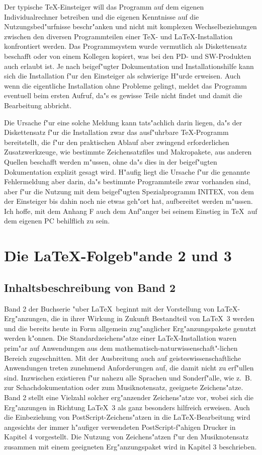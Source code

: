 \documentclass[twoside]{report}
\begin{document}
Der typische \TeX-Einsteiger will das Programm auf dem eigenen 
Individualrechner betreiben und die eigenen Kenntnisse auf die 
Nutzungsbed"urfnisse beschr"anken und nicht mit komplexen Wechselbeziehungen
zwischen den diversen Programmteilen einer \TeX- und \LaTeX-Installation
konfrontiert werden. Das Programmsystem wurde vermutlich als Diskettensatz
beschafft oder von einem Kollegen kopiert, was bei den PD- und SW-Produkten
auch erlaubt ist. Je nach beigef"ugter Dokumentation und Installationshilfe
kann sich die Installation f"ur den Einsteiger als schwierige H"urde erweisen.
Auch wenn die eigentliche Installation ohne Probleme gelingt, meldet das
Programm eventuell beim ersten Aufruf, da"s es gewisse Teile nicht findet und
damit die Bearbeitung abbricht.          

Die Ursache f"ur eine solche Meldung kann tats"achlich darin liegen, da"s
der Diskettensatz f"ur die Installation zwar das ausf"uhrbare \TeX-Programm
bereitstellt, die f"ur den praktischen Ablauf aber zwingend erforderlichen
Zusatzwerkzeuge, wie bestimmte Zeichensatzfiles und Makropakete, aus anderen
Quellen beschafft werden m"ussen, ohne da"s dies in der beigef"ugten
Dokumentation explizit gesagt wird. H"aufig liegt die Ursache f"ur die
genannte Fehlermeldung aber darin, da"s bestimmte Programmteile zwar vorhanden
sind, aber f"ur die Nutzung mit dem beigef"ugten Spezialprogramm INITEX, 
von dem der Einsteiger bis dahin noch nie etwas geh"ort hat, aufbereitet werden
m"ussen.  Ich hoffe, mit dem Anhang F auch dem Anf"anger 
bei seinem Einstieg in \TeX\ auf dem eigenen PC behilflich  zu sein.

\section{Die \LaTeX-Folgeb"ande 2 und 3}
\subsection{Inhaltsbeschreibung von Band 2}
Band 2 der Buchserie "uber \LaTeX\ beginnt mit der Vorstellung von 
\LaTeX-Erg"anzungen, die in ihrer Wirkung in Zukunft Bestandteil von
\LaTeX~3 werden und die bereits heute in Form allgemein zug"anglicher
Erg"anzungspakete genutzt werden k"onnen. Die Standardzeichens"atze einer
\LaTeX-Installation waren prim"ar auf Anwendungen aus dem
mathematisch-naturwissenschaft"-lichen Bereich zugeschnitten. 
Mit der Ausbreitung auch auf geisteswissenschaftliche Anwendungen treten
zunehmend Anforderungen auf, die damit nicht zu erf"ullen sind. Inzwischen
existieren f"ur nahezu alle Sprachen und Sonderf"alle, wie z.~B. zur
Schachdokumentation oder zum Musiknotensatz, geeignete Zeichens"atze.
Band 2 stellt eine Vielzahl solcher erg"anzender Zeichens"atze vor, wobei sich
die Erg"anzungen in Richtung \LaTeX~3 als ganz besonders hilfreich erweisen.
Auch die Einbeziehung von PostScript-Zeichens"atzen in die \LaTeX-Bearbeitung
wird angesichts der immer h"aufiger verwendeten PostScript-f"ahigen Drucker
in Kapitel 4 vorgestellt. Die Nutzung von Zeichens"atzen f"ur den Musiknotensatz
zusammen mit einem geeigneten Erg"anzungspaket wird in  Kapitel 3 beschrieben. 
\end{document}
